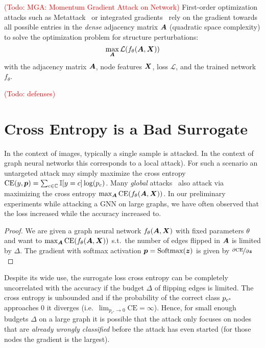 \documentclass[sigconf,authordraft]{acmart}
\newcommand{\adj}{\mA}
\newcommand{\features}{\mX}
\newcommand{\todo}[1]{\textcolor{red}{(Todo: #1)}}
\begin{document}
\todo{MGA: Momentum Gradient Attack on Network} First-order optimization attacks such as Metattack~\citep{Zugner2019a} or integrated gradients~\citep{Wu2019} rely on the gradient towards all possible entries in the \textit{dense} adjacency matrix \(\adj\) (quadratic space complexity) to solve the optimization problem for structure perturbations:
\begin{equation}\label{eq:attack}
  \max_{\adj} \mathcal{L}(f_{\theta}(\adj, \features))
\end{equation}
with the adjacency matrix \(\adj\), node features \(\features\), loss \(\mathcal{L}\), and the trained network \(f_{\theta}\).

\todo{defenses}

\section{Cross Entropy is a Bad Surrogate}\label{sec:related} %

In the context of images, typically a single sample is attacked. In the context of graph neural networks this corresponds to a local attack). For such a scenario an untargeted attack may simply maximize the cross entropy \(\text{CE}(y, {\bm{p}}) = \sum_{c \in {\mathbb{C}}} \mathbb{I}[y = c] \log({p}_{c})\). Many \emph{global} attacks~\citet{Chen2018, Wu2019, Xu2018, Zugner2019a} also attack via maximizing the cross entropy \(\max_{\adj} \text{CE}(f_{\theta}(\adj, \features))\). In our preliminary experiments while attacking a GNN on large graphs, we have often observed that the loss increased while the accuracy increased to.

\begin{proof}
  We are given a graph neural network \(f_{\theta}(\adj, \features)\) with fixed parameters \(\theta\) and want to \(\max_{\adj} \text{CE}(f_{\theta}(\adj, \features))\) s.t.\ the number of edges flipped in \(\adj\) is limited by \(\Delta\). The gradient with softmax activation \({\bm{p}} = \text{Softmax}({\bm{z}})\) is given by \(\nicefrac{\partial \text{CE}}{\partial {\bm{z}}}\)
\end{proof}

Despite its wide use, the surrogate loss cross entropy can be completely uncorrelated with the accuracy if the budget \(\Delta\) of flipping edges is limited. %
The cross entropy is unbounded and if the probability of the correct class \({p}_{c^*}\) approaches 0 it diverges (i.e.\ \(\lim_{p_{c^*} \to 0} \text{CE} = \infty\)). Hence, for small enough budgets \(\Delta\) on a large graph it is possible that the attack only focuses on nodes that are \emph{already wrongly classified} before the attack has even started (for those nodes the gradient is the largest).
\end{document}
